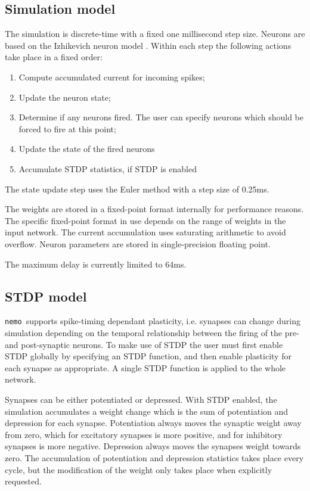 \documentclass[a4paper]{article}
\newcommand{\nemo}{\texttt{nemo}}
\begin{document}
\subsection{Simulation model}

The simulation is discrete-time with a fixed one millisecond step size.
Neurons are based on the Izhikevich neuron model \cite{izhikevich2003simple_model}.
Within each step the following actions take place in a fixed order:

\begin{enumerate}
	\item Compute accumulated current for incoming spikes;
	\item Update the neuron state;
	\item Determine if any neurons fired. The user can specify neurons which should be forced to fire at this point;
	\item Update the state of the fired neurons
	\item Accumulate STDP statistics, if STDP is enabled
\end{enumerate}

The state update step uses the Euler method with a step size of 0.25ms. 

The weights are stored in a fixed-point format internally for performance reasons.
The specific fixed-point format in use depends on the range of weights in the input network.
The current accumulation uses saturating arithmetic to avoid overflow.
Neuron parameters are stored in single-precision floating point.

The maximum delay is currently limited to 64ms.

\subsection{STDP model}
\label{stdp}

\nemo\ supports spike-timing dependant plasticity,
	i.e. synapses can change during simulation depending on the temporal relationship 
between the firing of the pre- and post-synaptic neurons. 
To make use of STDP the user must first enable STDP globally by specifying an STDP function,
and then enable plasticity for each synapse as appropriate.
A single STDP function is applied to the whole network.

Synapses can be either potentiated or depressed.
With STDP enabled,
	the simulation accumulates a weight change
	which is the sum of potentiation and depression for each synapse. 
Potentiation always moves the synaptic weight away from zero,
	which for excitatory synapses is more positive,
	and for inhibitory synapses is more negative.
Depression always moves the synapses weight towards zero.
The accumulation of potentiation and depression statistics takes place every cycle,
	but the modification of the weight only takes place when explicitly requested.
\end{document}
